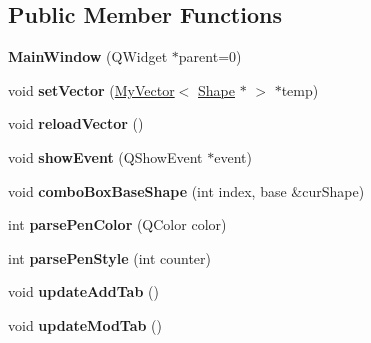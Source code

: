 \subsection*{Public Member Functions}
\begin{DoxyCompactItemize}
\item 
\hypertarget{classMainWindow_a8b244be8b7b7db1b08de2a2acb9409db}{{\bfseries Main\-Window} (Q\-Widget $\ast$parent=0)}\label{classMainWindow_a8b244be8b7b7db1b08de2a2acb9409db}

\item 
\hypertarget{classMainWindow_a5fb4bbae0c6be3fcc88900c8956173db}{void {\bfseries set\-Vector} (\hyperlink{classnserkkvector_1_1MyVector}{My\-Vector}$<$ \hyperlink{classShape}{Shape} $\ast$ $>$ $\ast$temp)}\label{classMainWindow_a5fb4bbae0c6be3fcc88900c8956173db}

\item 
\hypertarget{classMainWindow_a4205e879c75cff5f992f0f9c9accffc7}{void {\bfseries reload\-Vector} ()}\label{classMainWindow_a4205e879c75cff5f992f0f9c9accffc7}

\item 
\hypertarget{classMainWindow_a3dfe834b2836b316908ace3f38c06db2}{void {\bfseries show\-Event} (Q\-Show\-Event $\ast$event)}\label{classMainWindow_a3dfe834b2836b316908ace3f38c06db2}

\item 
\hypertarget{classMainWindow_afb9c74c4702c602f4b60e669b76cf339}{void {\bfseries combo\-Box\-Base\-Shape} (int index, base \&cur\-Shape)}\label{classMainWindow_afb9c74c4702c602f4b60e669b76cf339}

\item 
\hypertarget{classMainWindow_af54a660c334cabf6add34d5e8c048cc1}{int {\bfseries parse\-Pen\-Color} (Q\-Color color)}\label{classMainWindow_af54a660c334cabf6add34d5e8c048cc1}

\item 
\hypertarget{classMainWindow_a82e285c2886a18a76aa0ed47c45ab566}{int {\bfseries parse\-Pen\-Style} (int counter)}\label{classMainWindow_a82e285c2886a18a76aa0ed47c45ab566}

\item 
\hypertarget{classMainWindow_a24fc2fa76e0d386c0562947b55786129}{void {\bfseries update\-Add\-Tab} ()}\label{classMainWindow_a24fc2fa76e0d386c0562947b55786129}

\item 
\hypertarget{classMainWindow_a9c5df82c43a4ef712a17e8f8503f2cc8}{void {\bfseries update\-Mod\-Tab} ()}\label{classMainWindow_a9c5df82c43a4ef712a17e8f8503f2cc8}

\end{DoxyCompactItemize}
